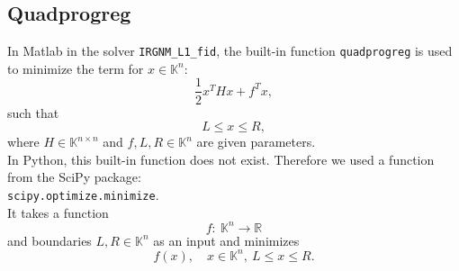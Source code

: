 \documentclass[12pt]{scrartcl}
\begin{document}
\subsection{Quadprogreg}
In Matlab in the solver \texttt{IRGNM\_L1\_fid}, the built-in function \texttt{quadprogreg} is used to minimize the term for $x\in\mathbb{K}^n$:
$$\frac{1}{2}x^THx+f^Tx,$$
such that
$$L\leq x\leq R,$$
where $H\in\mathbb{K}^{n\times n}$ and $f,L,R\in\mathbb{K}^n$ are given parameters.\\
In Python, this built-in function does not exist. Therefore we used a function from the SciPy package:\\
\texttt{scipy.optimize.minimize}.\\
It takes a function 
$$f:~\mathbb{K}^n\rightarrow\mathbb{R}$$
and boundaries $L,R\in\mathbb{K}^n$ as an input and minimizes
$$f(x),\quad x\in\mathbb{K}^n,~L\leq x\leq R.$$
\end{document}
